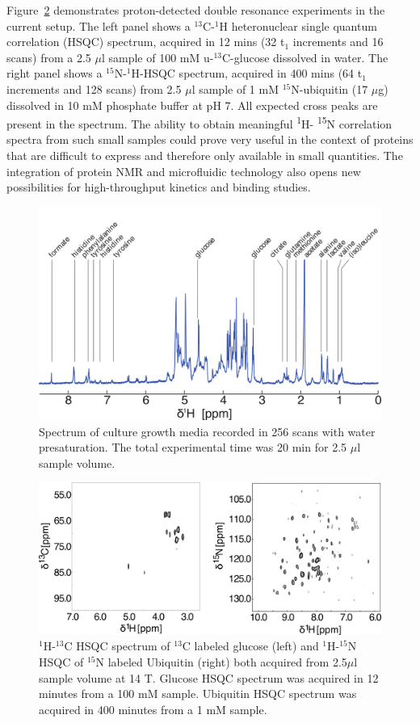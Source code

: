 \documentclass[preprint,12pt]{article}
\begin{document}
Figure~\ref{fig:HSQC} demonstrates proton-detected double resonance experiments in the current setup. 
The left panel shows a $^{13}$C-$^{1}$H heteronuclear single quantum correlation (HSQC) spectrum, acquired in 12 mins 
(32 t$_1$ increments and 16 scans) 
from a 2.5 $\mu$l sample of 100 mM u-$^{13}$C-glucose dissolved in water. The right panel shows a 
$^{15}$N-$^{1}$H-HSQC spectrum, acquired in 400 mins (64 t$_1$ increments and 128 scans) 
from 2.5 $\mu$l sample of 1 mM $^{15}$N-ubiquitin (17 $\mu$g) dissolved in 10 mM phosphate buffer at pH 7. 
All expected cross peaks are present in the spectrum. The ability to obtain meaningful  \textsuperscript{1}H-
\textsuperscript{15}N correlation spectra from such small samples could prove very useful in the context of
proteins that are difficult to express and therefore only available in small quantities. The integration of
protein NMR and microfluidic technology also opens new possibilities for high-throughput kinetics and 
binding studies. 

\begin{figure}
\centering
\includegraphics[width=.7\linewidth,keepaspectratio=true]{./figures/media-180125-005-bigger-font.png} 
\caption{Spectrum of culture growth media recorded in 256 scans with water presaturation. The total experimental time was 20 min for 2.5 $\mu$l sample volume.}
\label{fig:media-spec} 
\end{figure}

\begin{figure}
\centering
\includegraphics[width=.7\linewidth,keepaspectratio=true]{./figures/ms5n17-tlp-sp-180612-HSQCspect.png} 
\caption{ $^1$H-$^{13}$C HSQC spectrum of $^{13}$C labeled glucose (left) and $^1$H-$^{15}$N HSQC of $^{15}$N labeled Ubiquitin (right) both acquired from 2.5$\mu$l sample volume at 14 T. Glucose HSQC spectrum was acquired in 12 minutes from a 100 mM sample. Ubiquitin HSQC spectrum was acquired in 400 minutes from a 1 mM sample.}
\label{fig:HSQC} 
\end{figure}
\end{document}
